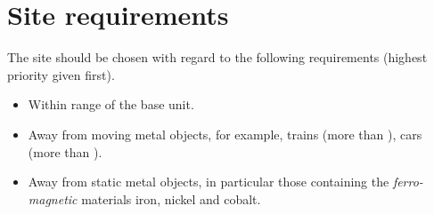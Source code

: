 \chapter{Site requirements}

The site should be chosen with regard to the following requirements
(highest priority given first).

\begin{itemize}
\item Within range of the base unit.
\item Away from moving metal objects, for example, trains (more than
  ), cars (more than ).
\item Away from static metal objects, in particular those containing
  the \emph{ferro-magnetic} materials iron, nickel and cobalt.
\end{itemize}

